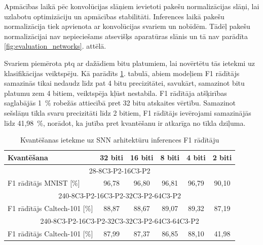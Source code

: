 Apmācības laikā pēc konvolūcijas slāņiem ievietoti pakešu normalizācijas slāņi, lai uzlabotu optimizāciju un apmācības stabilitāti. Inferences laikā pakešu normalizācija tiek apvienota ar konvolūcijas svariem un nobīdēm. Tādēļ pakešu normalizācijai nav nepieciešams atsevišķs aparatūras slānis un tā nav parādīta \ref{fig:evaluation_networks}. attēlā.

Svariem piemērota \Gls{ptq} ar dažādiem bitu platumiem, lai novērtētu tās ietekmi uz klasifikācijas veiktspēju. Kā parādīts
\ref{tab:quant_compare}. tabulā, abiem modeļiem F1 rādītājs samazinās tikai nedaudz līdz pat 4 bitu precizitātei, savukārt,
samazinot bitu platumu zem 4 bitiem, veiktspēja kļūst nestabila. F1 rādītāja atšķirības saglabājās 1~\% robežās attiecībā
pret 32 bitu atskaites vērtību. Samazinot sešslāņu tīkla svaru precizitāti līdz 2 bitiem, F1 rādītājs ievērojami samazinājās līdz
41,98~\%, norādot, ka jutība pret kvantēšanu ir atkarīga no tīkla dziļuma.

\begin{table}
\centering
\caption{Kvantēšanas ietekme uz SNN arhitektūru inferences F1 rādītāju}
\label{tab:quant_compare}
\begin{tabular}{@{}lccccc@{}}
\toprule
\textbf{Kvantēšana}       & \textbf{32 biti} & \textbf{16 biti} & \textbf{8 biti} & \textbf{4 biti} & \textbf{2 biti}    \\ \midrule
\multicolumn{6}{c}{28\texttimes 28-8C3-P2-16C3-P2} \\
\midrule
F1 rādītājs MNIST [\%]        & 96{,}78   & 96{,}80   & 96{,}81   & 96{,}79   & 90{,}10   \\
\midrule
\multicolumn{6}{c}{240\texttimes 180-8C3-P2-16C3-P2-32C3-P2-64C3-P2} \\
\midrule
F1 rādītājs Caltech-101 [\%]  & 88{,}87   & 88{,}67   & 89{,}07   & 89{,}32   & 87{,}19   \\
\midrule
\multicolumn{6}{c}{240\texttimes 180-8C3-P2-16C3-P2-32C3-32C3-P2-64C3-64C3-P2} \\
\midrule
F1 rādītājs Caltech-101 [\%]  & 87{,}99 & 87{,}37  & 86{,}85  &  88{,}10  & 41{,}98 \\
\bottomrule
\end{tabular}
\end{table}

